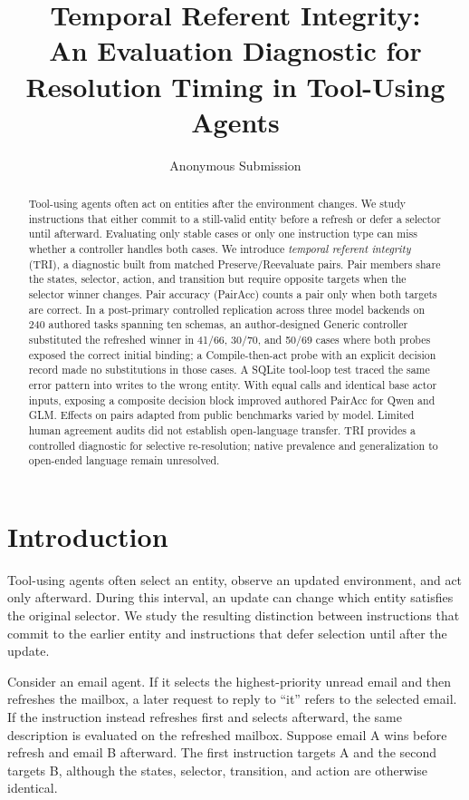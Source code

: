 \documentclass[letterpaper]{article}
\title{Temporal Referent Integrity:\\
An Evaluation Diagnostic for Resolution Timing in Tool-Using Agents}
\author{Anonymous Submission}
\begin{document}
\maketitle

\begin{abstract}
Tool-using agents often act on entities after the environment changes. We study instructions that
either commit to a still-valid entity before a refresh or defer a selector until afterward.
Evaluating only stable cases or only one instruction type can miss whether a controller handles
both cases. We introduce \emph{temporal referent integrity} (TRI), a diagnostic built from matched
Preserve/Reevaluate pairs. Pair members share the states, selector, action, and transition but
require opposite targets when the selector winner changes. Pair accuracy (PairAcc) counts a pair
only when both targets are correct. In a post-primary controlled replication across three model
backends on 240 authored tasks spanning ten schemas, an author-designed Generic controller
substituted the refreshed winner in 41/66, 30/70,
and 50/69 cases where both probes exposed the correct initial binding; a Compile-then-act probe
with an explicit decision record made no substitutions in those cases. A SQLite tool-loop test
traced the same error pattern into writes to the wrong entity. With equal calls and identical base
actor inputs, exposing a composite decision block improved authored PairAcc for Qwen and GLM.
Effects on pairs adapted from public benchmarks varied by model. Limited human agreement audits
did not establish open-language transfer. TRI provides a controlled diagnostic for selective
re-resolution; native prevalence and
generalization to open-ended language remain unresolved.
\end{abstract}

\section{Introduction}

Tool-using agents often select an entity, observe an updated environment, and act only afterward.
During this interval, an update can change which entity satisfies the original selector. We study
the resulting distinction between instructions that commit to the earlier entity and instructions
that defer selection until after the update.

Consider an email agent. If it selects the highest-priority unread email and then refreshes the
mailbox, a later request to reply to ``it'' refers to the selected email. If the instruction instead
refreshes first and selects afterward, the same description is evaluated on the refreshed mailbox.
Suppose email A wins before refresh and email B afterward. The first instruction targets A and the
second targets B, although the states, selector, transition, and action are otherwise identical.
\end{document}
